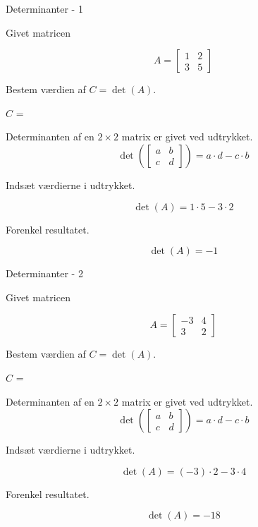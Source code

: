 \documentclass{article}
\begin{document}
\tableofcontents
\newpage

\begin{exercise}{Determinanter - 1}

Givet matricen

\[
A = \left[\begin{array}{rr}
1 & 2 \\ 
3 & 5 
\end{array} \right]
\]

Bestem værdien af $C = \det(A)$.

$C$ = 

\hint
Determinanten af en $2 \times 2$ matrix er givet ved udtrykket.
\[
\det \left( \left[\begin{array}{rr}
a & b \\ 
c & d 
\end{array} \right] \right) = a \cdot d - c \cdot b
\]

\hint
Indsæt værdierne i udtrykket.

\hint
\[
\det \left( A \right) = 1 \cdot 5 - 3 \cdot 2
\]

\hint
Forenkel resultatet.

\hint
\[
\det \left( A \right) = -1
\]

\end{exercise}


\begin{exercise}{Determinanter - 2}

Givet matricen

\[
A = \left[\begin{array}{rr}
-3 & 4 \\ 
3 & 2 
\end{array} \right]
\]

Bestem værdien af $C = \det(A)$.

$C$ = 

\hint
Determinanten af en $2 \times 2$ matrix er givet ved udtrykket.
\[
\det \left( \left[\begin{array}{rr}
a & b \\ 
c & d 
\end{array} \right] \right) = a \cdot d - c \cdot b
\]

\hint
Indsæt værdierne i udtrykket.

\hint
\[
\det \left( A \right) = (-3) \cdot 2 - 3 \cdot 4
\]

\hint
Forenkel resultatet.

\hint
\[
\det \left( A \right) = -18
\]

\end{exercise}
\end{document}
